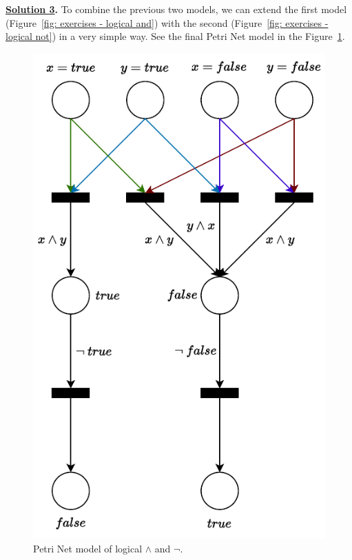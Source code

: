 \highspace
\textbf{\underline{Solution 3}.} To combine the previous two models, we can extend the first model (Figure~\ref{fig: exercises - logical and}) with the second (Figure~\ref{fig: exercises - logical not}) in a very simple way. See the final Petri Net model in the Figure~\ref{fig: exercises - logical and, not}.

\begin{figure}[!htp]
    \centering
    \includegraphics[width=.7\textwidth]{img/logical-and-3.pdf}
    \caption{Petri Net model of logical $\land$ and $\lnot$.}
    \label{fig: exercises - logical and, not}
\end{figure}